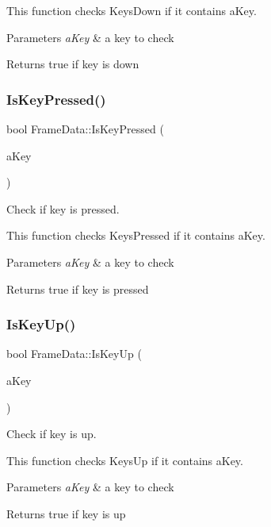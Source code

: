 This function checks Keys\+Down if it contains a\+Key. 
\begin{DoxyParams}{Parameters}
{\em a\+Key} & a key to check \\
\hline
\end{DoxyParams}
\begin{DoxyReturn}{Returns}
true if key is down 
\end{DoxyReturn}
\mbox{\label{class_frame_data_ac7f44f5453c5c50001bf8ebbe021f048}} 
\subsubsection{IsKeyPressed()}
{\footnotesize\ttfamily bool Frame\+Data\+::\+Is\+Key\+Pressed (\begin{DoxyParamCaption}\item[{S\+D\+L\+\_\+\+Keycode}]{a\+Key }\end{DoxyParamCaption})}



Check if key is pressed. 

This function checks Keys\+Pressed if it contains a\+Key. 
\begin{DoxyParams}{Parameters}
{\em a\+Key} & a key to check \\
\hline
\end{DoxyParams}
\begin{DoxyReturn}{Returns}
true if key is pressed 
\end{DoxyReturn}
\mbox{\label{class_frame_data_adb3ebfc77784082631b282abddb105eb}} 
\subsubsection{IsKeyUp()}
{\footnotesize\ttfamily bool Frame\+Data\+::\+Is\+Key\+Up (\begin{DoxyParamCaption}\item[{S\+D\+L\+\_\+\+Keycode}]{a\+Key }\end{DoxyParamCaption})}



Check if key is up. 

This function checks Keys\+Up if it contains a\+Key. 
\begin{DoxyParams}{Parameters}
{\em a\+Key} & a key to check \\
\hline
\end{DoxyParams}
\begin{DoxyReturn}{Returns}
true if key is up 
\end{DoxyReturn}
\mbox{\label{class_frame_data_af76fe435123acbaa58f50cddd8ee0dcb}} 
